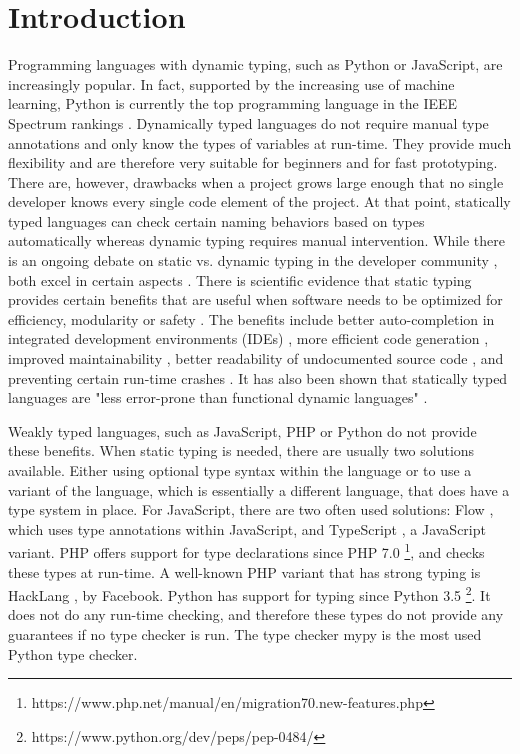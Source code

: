 \section{Introduction}

Programming languages with dynamic typing, such as Python or JavaScript, are increasingly popular. In fact, supported by the increasing use of machine learning, Python is currently the top programming language in the IEEE Spectrum rankings \cite{2019Interactive:Languages}. Dynamically typed languages do not require manual type annotations and only know the types of variables at run-time. They provide much flexibility and are therefore very suitable for beginners and for fast prototyping. There are, however, drawbacks when a project grows large enough that no single developer knows every single code element of the project. At that point, statically typed languages can check certain naming behaviors based on types automatically whereas dynamic typing requires manual intervention. While there is an ongoing debate on static vs. dynamic typing in the developer community \cite{Ray2017AGitHub}, both excel in certain aspects \cite{Meijer2004StaticLanguages}. There is scientific evidence that static typing provides certain benefits that are useful when software needs to be optimized for efficiency, modularity or safety \cite{Vitousek2014DesignPython}. The benefits include better auto-completion in integrated development environments (IDEs) \cite{Malik2019NL2Type:Information}, more efficient code generation \cite{Vitousek2014DesignPython}, improved maintainability \cite{Hanenberg2014AnMaintainability}, better readability of undocumented source code \cite{Hanenberg2014AnMaintainability}, and preventing certain run-time crashes \cite{Malik2019NL2Type:Information}. It has also been shown that statically typed languages are "less error-prone than functional dynamic languages" \cite{Ray2017AGitHub}.

Weakly typed languages, such as JavaScript, PHP or Python do not provide these benefits. When static typing is needed, there are usually two solutions available. Either using optional type syntax within the language or to use a variant of the language, which is essentially a different language, that does have a type system in place. For JavaScript, there are two often used solutions: Flow \cite{2014Flow}, which uses type annotations within JavaScript, and TypeScript \cite{2012TypeScript}, a JavaScript variant. PHP offers support for type declarations since PHP 7.0 \footnote{https://www.php.net/manual/en/migration70.new-features.php}, and checks these types at run-time. A well-known PHP variant that has strong typing is HackLang \cite{2014HackLang}, by Facebook. Python has support for typing since Python 3.5 \footnote{https://www.python.org/dev/peps/pep-0484/}. It does not do any run-time checking, and therefore these types do not provide any guarantees if no type checker is run. The type checker mypy \cite{2012Mypy} is the most used Python type checker.

